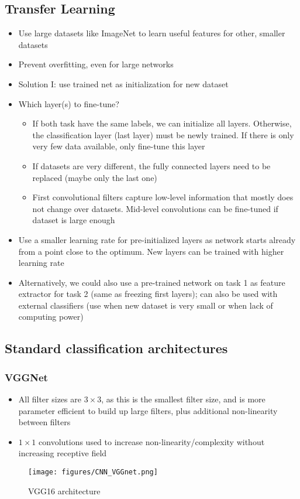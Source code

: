 \subsection{Transfer Learning}
\begin{itemize}
	\item Use large datasets like ImageNet to learn useful features for other, smaller datasets
	\item Prevent overfitting, even for large networks
	\item Solution I: use trained net as initialization for new dataset
	\item Which layer(s) to fine-tune?
	\begin{itemize}
		\item If both task have the same labels, we can initialize all layers. Otherwise, the classification layer (last layer) must be newly trained. If there is only very few data available, only fine-tune this layer
		\item If datasets are very different, the fully connected layers need to be replaced (maybe only the last one)
		\item First convolutional filters capture low-level information that mostly does not change over datasets. Mid-level convolutions can be fine-tuned if dataset is large enough
	\end{itemize}
	\item Use a smaller learning rate for pre-initialized layers as network starts already from a point close to the optimum. New layers can be trained with higher learning rate
	\item Alternatively, we could also use a pre-trained network on task 1 as feature extractor for task 2 (same as freezing first layers); can also be used with external classifiers (use when new dataset is very small or when lack of computing power)
\end{itemize}
\subsection{Standard classification architectures}
\subsubsection{VGGNet}
\begin{itemize}
	\item All filter sizes are $3\times 3$, as this is the smallest filter size, and is more parameter efficient to build up large filters, plus additional non-linearity between filters
	\item $1\times 1$ convolutions used to increase non-linearity/complexity without increasing receptive field
\end{itemize}
\begin{figure}[ht!]
	\centering
	\texttt{[image: figures/CNN\_VGGnet.png]}
	\caption{VGG16 architecture}
	\label{fig:CNN_VVGnet}
\end{figure}

